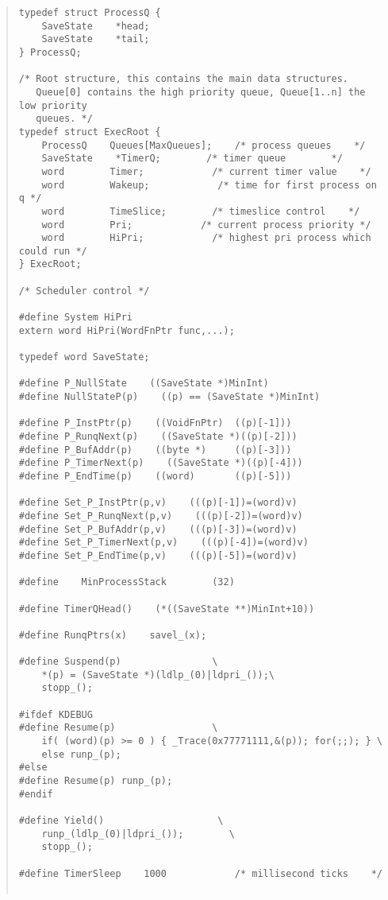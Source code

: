 \begin {quote}
\begin{verbatim}
typedef struct ProcessQ {
    SaveState    *head;
    SaveState    *tail;
} ProcessQ;

/* Root structure, this contains the main data structures.
   Queue[0] contains the high priority queue, Queue[1..n] the low priority
   queues. */
typedef struct ExecRoot {
    ProcessQ    Queues[MaxQueues];    /* process queues    */
    SaveState    *TimerQ;        /* timer queue        */
    word        Timer;            /* current timer value    */
    word        Wakeup;            /* time for first process on q */
    word        TimeSlice;        /* timeslice control    */
    word        Pri;            /* current process priority */
    word        HiPri;            /* highest pri process which could run */
} ExecRoot;

/* Scheduler control */

#define System HiPri
extern word HiPri(WordFnPtr func,...);

typedef word SaveState;

#define P_NullState    ((SaveState *)MinInt)
#define NullStateP(p)    ((p) == (SaveState *)MinInt)

#define P_InstPtr(p)    ((VoidFnPtr)  ((p)[-1]))
#define P_RunqNext(p)    ((SaveState *)((p)[-2]))
#define P_BufAddr(p)    ((byte *)     ((p)[-3]))
#define P_TimerNext(p)    ((SaveState *)((p)[-4]))
#define P_EndTime(p)    ((word)       ((p)[-5]))

#define Set_P_InstPtr(p,v)    (((p)[-1])=(word)v)
#define Set_P_RunqNext(p,v)    (((p)[-2])=(word)v)
#define Set_P_BufAddr(p,v)    (((p)[-3])=(word)v)
#define Set_P_TimerNext(p,v)    (((p)[-4])=(word)v)
#define Set_P_EndTime(p,v)    (((p)[-5])=(word)v)

#define    MinProcessStack        (32)

#define TimerQHead()    (*((SaveState **)MinInt+10))

#define RunqPtrs(x)    savel_(x);

#define Suspend(p)                \
    *(p) = (SaveState *)(ldlp_(0)|ldpri_());\
    stopp_();

#ifdef KDEBUG    
#define Resume(p)                 \
    if( (word)(p) >= 0 ) { _Trace(0x77771111,&(p)); for(;;); } \
    else runp_(p);
#else
#define Resume(p) runp_(p);
#endif

#define Yield()                    \
    runp_(ldlp_(0)|ldpri_());        \
    stopp_();

#define TimerSleep    1000            /* millisecond ticks    */


\end{verbatim}
\end{quote}
